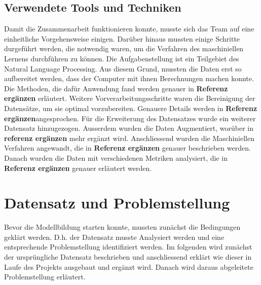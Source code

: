\documentclass[researchlab,palatino]{AIGpaper}
\begin{document}
\subsection{Verwendete Tools und Techniken}
Damit die Zusammenarbeit funktionieren konnte, musste sich das Team auf eine einheitliche Vorgehensweise einigen. Darüber hinaus mussten einige Schritte durgeführt werden, die notwendig waren, um die Verfahren des maschiniellen Lernens durchführen zu können. Die Aufgabenstellung ist ein Teilgebiet des Natural Language Processing. Aus diesem Grund, mussten die Daten erst so aufbereitet werden, dass der Computer mit ihnen Berechnungen machen konnte. Die Methoden, die dafür Anwendung fand werden genauer in \textbf{Referenz ergänzen} erläutert. Weitere Vorverarbeitungsschritte waren die Bereinigung der Datensätze, um sie optimal vorzubereiten. Genauere Details werden in \textbf{Referenz ergänzen}angesprochen. Für die Erweiterung des Datensatzes wurde ein weiterer Datensatz hinzugezogen. Ausserdem wurden die Daten Augmentiert, worüber in \textbf{referenz ergänzen} mehr ergänzt wird. Anschliessend wurden die Maschiniellen Verfahren angewandt, die in \textbf{Referenz ergänzen} genauer beschrieben werden. Danach wurden die Daten mit verschiedenen Metriken analysiert, die in \textbf{Referenz ergänzen} genauer erläutert werden.


\section{Datensatz und Problemstellung}
Bevor die Modellbildung starten konnte, mussten zunächst die Bedingungen geklärt werden. D.h. der Datensatz musste Analysiert werden und eine entsprechende Problemstellung identifiziert werden. Im folgenden wird zunächst der ursprüngliche Datensatz beschrieben und anschliessend erklärt wie dieser in Laufe des Projekts ausgebaut und ergänzt wird. Danach wird daraus abgeleitete Problemstellung erläutert.
\end{document}
